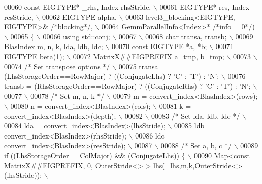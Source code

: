 \begin{DoxyCode}
00060 \textcolor{preprocessor}{  const EIGTYPE* \_rhs, Index rhsStride, \(\backslash\)}
00061 \textcolor{preprocessor}{  EIGTYPE* res, Index resStride, \(\backslash\)}
00062 \textcolor{preprocessor}{  EIGTYPE alpha, \(\backslash\)}
00063 \textcolor{preprocessor}{  level3\_blocking<EIGTYPE, EIGTYPE>& }\textcolor{comment}{/*blocking*/}\textcolor{preprocessor}{, \(\backslash\)}
00064 \textcolor{preprocessor}{  GemmParallelInfo<Index>* }\textcolor{comment}{/*info = 0*/}\textcolor{preprocessor}{) \(\backslash\)}
00065 \textcolor{preprocessor}{\{ \(\backslash\)}
00066 \textcolor{preprocessor}{  using std::conj; \(\backslash\)}
00067 \textcolor{preprocessor}{\(\backslash\)}
00068 \textcolor{preprocessor}{  char transa, transb; \(\backslash\)}
00069 \textcolor{preprocessor}{  BlasIndex m, n, k, lda, ldb, ldc; \(\backslash\)}
00070 \textcolor{preprocessor}{  const EIGTYPE *a, *b; \(\backslash\)}
00071 \textcolor{preprocessor}{  EIGTYPE beta(1); \(\backslash\)}
00072 \textcolor{preprocessor}{  MatrixX##EIGPREFIX a\_tmp, b\_tmp; \(\backslash\)}
00073 \textcolor{preprocessor}{\(\backslash\)}
00074 \textcolor{preprocessor}{}\textcolor{comment}{/* Set transpose options */}\textcolor{preprocessor}{ \(\backslash\)}
00075 \textcolor{preprocessor}{  transa = (LhsStorageOrder==RowMajor) ? ((ConjugateLhs) ? 'C' : 'T') : 'N'; \(\backslash\)}
00076 \textcolor{preprocessor}{  transb = (RhsStorageOrder==RowMajor) ? ((ConjugateRhs) ? 'C' : 'T') : 'N'; \(\backslash\)}
00077 \textcolor{preprocessor}{\(\backslash\)}
00078 \textcolor{preprocessor}{}\textcolor{comment}{/* Set m, n, k */}\textcolor{preprocessor}{ \(\backslash\)}
00079 \textcolor{preprocessor}{  m = convert\_index<BlasIndex>(rows);  \(\backslash\)}
00080 \textcolor{preprocessor}{  n = convert\_index<BlasIndex>(cols);  \(\backslash\)}
00081 \textcolor{preprocessor}{  k = convert\_index<BlasIndex>(depth); \(\backslash\)}
00082 \textcolor{preprocessor}{\(\backslash\)}
00083 \textcolor{preprocessor}{}\textcolor{comment}{/* Set lda, ldb, ldc */}\textcolor{preprocessor}{ \(\backslash\)}
00084 \textcolor{preprocessor}{  lda = convert\_index<BlasIndex>(lhsStride); \(\backslash\)}
00085 \textcolor{preprocessor}{  ldb = convert\_index<BlasIndex>(rhsStride); \(\backslash\)}
00086 \textcolor{preprocessor}{  ldc = convert\_index<BlasIndex>(resStride); \(\backslash\)}
00087 \textcolor{preprocessor}{\(\backslash\)}
00088 \textcolor{preprocessor}{}\textcolor{comment}{/* Set a, b, c */}\textcolor{preprocessor}{ \(\backslash\)}
00089 \textcolor{preprocessor}{  if ((LhsStorageOrder==ColMajor) && (ConjugateLhs)) \{ \(\backslash\)}
00090 \textcolor{preprocessor}{    Map<const MatrixX##EIGPREFIX, 0, OuterStride<> > lhs(\_lhs,m,k,OuterStride<>(lhsStride)); \(\backslash\)}

\end{DoxyCode}
